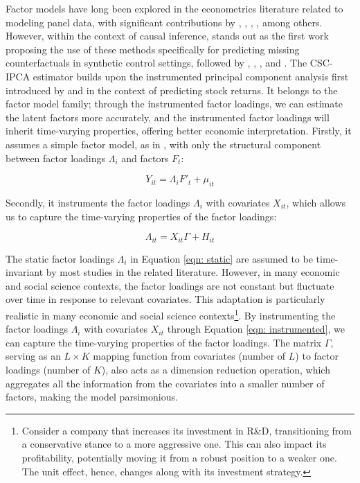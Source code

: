\documentclass[12pt]{article}
\begin{document}
Factor models have long been explored in the econometrics literature related to modeling panel data, with significant contributions by \cite{bai2003computation}, \cite{pesaran2006estimation}, \cite{stock2002forecasting}, \cite{eberhardt2009cross}, among others. However, within the context of causal inference, \cite{hsiao2012panel} stands out as the first work proposing the use of these methods specifically for predicting missing counterfactuals in synthetic control settings, followed by \cite{gobillon2016regional}, \cite{xu2017generalized}, \cite{chan2016policy}, and \cite{li2018inference}. The CSC-IPCA estimator builds upon the instrumented principal component analysis first introduced by \cite{kelly2020instrumented} and \cite{kelly2019characteristics} in the context of predicting stock returns. It belongs to the factor model family; through the instrumented factor loadings, we can estimate the latent factors more accurately, and the instrumented factor loadings will inherit time-varying properties, offering better economic interpretation. Firstly, it assumes a simple factor model, as in \cite{bai2003computation}, with only the structural component between factor loadings $\Lambda_i$ and factors $F_t$:

\begin{equation}
\label{eqn: static}
    Y_{it} = \Lambda_i F'_t + \mu_{it}
\end{equation}

\noindent Secondly, it instruments the factor loadings $\Lambda_i$ with covariates $X_{it}$, which allows us to capture the time-varying properties of the factor loadings:

\begin{equation}
\label{eqn: instrumented}
    \Lambda_{it} = X_{it}\Gamma + H_{it}
\end{equation}

The static factor loadings $\Lambda_i$ in Equation \ref{eqn: static} are assumed to be time-invariant by most studies in the related literature. However, in many economic and social science contexts, the factor loadings are not constant but fluctuate over time in response to relevant covariates. This adaptation is particularly realistic in many economic and social science contexts\footnote{Consider a company that increases its investment in R\&D, transitioning from a conservative stance to a more aggressive one. This can also impact its profitability, potentially moving it from a robust position to a weaker one. The unit effect, hence, changes along with its investment strategy.}. By instrumenting the factor loadings $\Lambda_i$ with covariates $X_{it}$ through Equation \ref{eqn: instrumented}, we can capture the time-varying properties of the factor loadings. The matrix $\Gamma$, serving as an $L \times K$ mapping function from covariates (number of $L$) to factor loadings (number of $K$), also acts as a dimension reduction operation, which aggregates all the information from the covariates into a smaller number of factors, making the model parsimonious.
\end{document}
